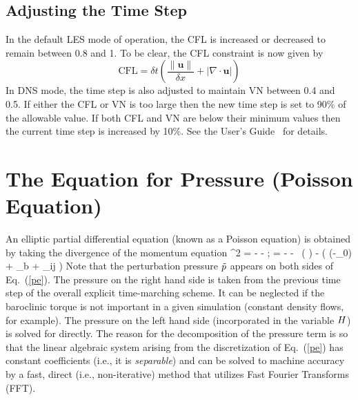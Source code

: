 \subsection{Adjusting the Time Step}

In the default LES mode of operation, the CFL is increased or decreased to remain between 0.8 and 1.  To be clear, the CFL constraint is now given by
\begin{equation}
\mbox{CFL} = \delta t \left( \frac{\|\mathbf{u}\|}{\delta x} + |\nabla\cdot\mathbf{u}| \right)
\end{equation}
In DNS mode, the time step is also adjusted to maintain VN between 0.4 and 0.5. If either the CFL or VN is too large then the new time step is set to 90\% of the allowable value.  If both CFL and VN are below their minimum values then the current time step is increased by 10\%.  See the User's Guide~\cite{FDS_Users_Guide} for details.


\section{The Equation for Pressure (Poisson Equation)}

An elliptic partial differential equation (known as a Poisson equation) is obtained by
taking the divergence of the momentum equation
\be \nabla^2 \cH =
     - - \nabla\!\cdot \bF
    \quad ; \quad \bF = - \bu\times\bo - \tp \, \nabla \! \left(  \right) - 
    \Big( (\rho-\rho_0) \bg + \bof_{\rm b} + \nabla\!\cdot \btau_{ij} \Big)
   \label{pe}\ee
Note that the perturbation pressure $\tilde{p}$ appears on both sides of Eq.~(\ref{pe}). The
pressure on the right hand side is taken from the previous time step of the
overall explicit time-marching scheme. It can be neglected if the baroclinic torque is
not important in a given simulation (constant density flows, for example). The pressure on the left hand side (incorporated
in the variable $H$) is solved for directly.
The reason for the decomposition of the pressure term is so that the linear algebraic system
arising from the discretization of Eq.~(\ref{pe})
has constant coefficients (i.e., it is {\em separable}) and can be solved to machine accuracy
by a fast, direct (i.e., non-iterative) method that utilizes
Fast Fourier Transforms (FFT).

